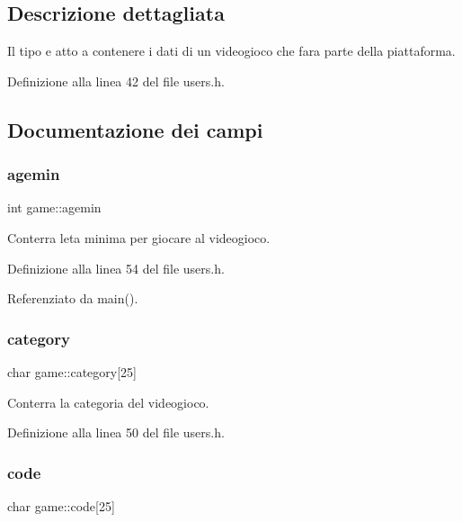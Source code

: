 \subsection{Descrizione dettagliata}
Il tipo e\textquotesingle{} atto a contenere i dati di un videogioco che fara\textquotesingle{} parte della piattaforma. 

Definizione alla linea 42 del file users.\+h.



\subsection{Documentazione dei campi}
\mbox{\label{structgame_a998f339d815e453842cbc20c5ab34d4d}} 
\subsubsection{\texorpdfstring{agemin}{agemin}}
{\footnotesize\ttfamily int game\+::agemin}



Conterra\textquotesingle{} l\textquotesingle{}eta\textquotesingle{} minima per giocare al videogioco. 



Definizione alla linea 54 del file users.\+h.



Referenziato da main().

\mbox{\label{structgame_ab3ae261d92cc8a130d350f72d092846d}} 
\subsubsection{\texorpdfstring{category}{category}}
{\footnotesize\ttfamily char game\+::category\mbox{[}25\mbox{]}}



Conterra\textquotesingle{} la categoria del videogioco. 



Definizione alla linea 50 del file users.\+h.

\mbox{\label{structgame_aa8fa3d611dae3fe6dbf21a9a8c159f50}} 
\subsubsection{\texorpdfstring{code}{code}}
{\footnotesize\ttfamily char game\+::code\mbox{[}25\mbox{]}}



